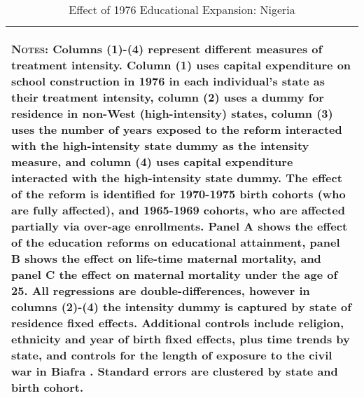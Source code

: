 \begin{subtables}
\begin{table}[htpb!]
\begin{center}
\begin{tabular}{p{5cm}cccc}
\multicolumn{5}{p{12.7cm}}{\begin{footnotesize}\textsc{Notes:} Columns (1)-(4) represent different measures of treatment intensity. Column (1) uses capital expenditure on school construction in 1976 in each individual's state as their treatment intensity, column (2) uses a dummy for residence in non-West (high-intensity) states, column (3) uses the number of years exposed to the reform interacted with the high-intensity state dummy as the intensity measure, and column (4) uses capital expenditure interacted with the high-intensity state dummy.  The effect of the reform is identified for 1970-1975 birth cohorts (who are fully affected), and 1965-1969 cohorts, who are affected partially via over-age enrollments. Panel A shows the effect of the education reforms on educational attainment, panel B shows the effect on life-time maternal mortality, and panel C the effect on maternal mortality under the age of 25.  All regressions are double-differences, however in columns (2)-(4) the intensity dummy is captured by state of residence fixed effects. Additional controls include religion, ethnicity and year of birth fixed effects, plus time trends by state, and controls for the length of exposure to the civil war in Biafra \citep{Akreshetal2012}.  Standard errors are clustered by state and birth cohort. \end{footnotesize}} \\									
\bottomrule									
\end{tabular}									
\caption{Effect of 1976 Educational Expansion: Nigeria}									
\vspace{-6mm}									
\label{tab:Nigeria}									
\end{center}									
\end{table}									



\end{subtables}
